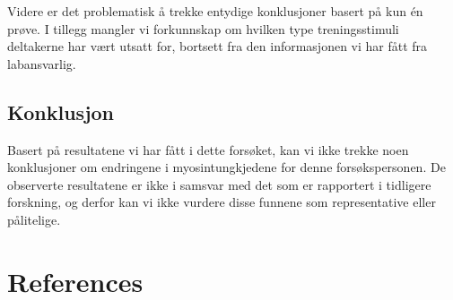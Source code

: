 \documentclass[
  letterpaper,
  DIV=11,
  numbers=noendperiod]{scrreprt}
\begin{document}
Videre er det problematisk å trekke entydige konklusjoner basert på kun
én prøve. I tillegg mangler vi forkunnskap om hvilken type
treningsstimuli deltakerne har vært utsatt for, bortsett fra den
informasjonen vi har fått fra labansvarlig.

\section{Konklusjon}\label{konklusjon-1}

Basert på resultatene vi har fått i dette forsøket, kan vi ikke trekke
noen konklusjoner om endringene i myosintungkjedene for denne
forsøkspersonen. De observerte resultatene er ikke i samsvar med det som
er rapportert i tidligere forskning, og derfor kan vi ikke vurdere disse
funnene som representative eller pålitelige.


\chapter*{References}\label{references}

\end{document}
